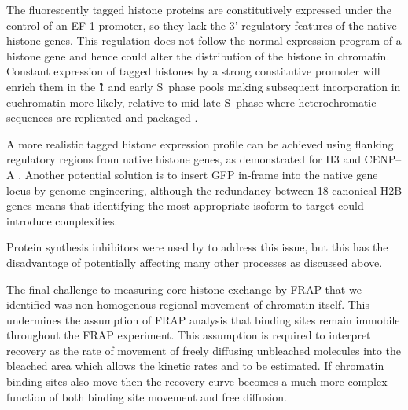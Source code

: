     The fluorescently tagged histone proteins are constitutively expressed 
    under the control of an EF-1\textalpha{} promoter, 
    so they lack the 3' regulatory features of the native histone genes.
    This regulation does not follow the normal expression program of a histone gene 
    and hence could alter the distribution of the histone in chromatin.
    Constant expression of tagged histones by a strong constitutive promoter
    will enrich them in the \G1{} and early S~phase pools
    making subsequent incorporation in euchromatin more likely,
    relative to mid-late S~phase where heterochromatic sequences 
    are replicated and packaged \citep{DNA-replication-timing}.

    A more realistic tagged histone expression profile can be achieved using 
    flanking regulatory regions from native histone genes,
    as demonstrated for H3 and CENP--A \citep{pMH3-plasmid,Kevin-pCA-TAG}.
    Another potential solution is to insert GFP in-frame into the native gene locus by genome engineering,
    although the redundancy between 18 canonical H2B genes means
    that identifying the most appropriate isoform to target could introduce complexities.

    Protein synthesis inhibitors were used by \cite{KimuraCook} to address this issue,
    but this has the disadvantage of potentially affecting many other processes as discussed above.



    The final challenge to measuring core histone exchange by FRAP that we identified 
    was non-homogenous regional movement of chromatin itself.
    This undermines the assumption of FRAP analysis that binding sites 
    remain immobile throughout the FRAP experiment.
    This assumption is required to interpret recovery
    as the rate of movement of freely diffusing unbleached molecules into the
    bleached area which allows the kinetic rates \Kon{} and \Koff{} to be estimated.
    If chromatin binding sites also move then the recovery curve becomes a 
    much more complex function of both binding site movement and free diffusion.

